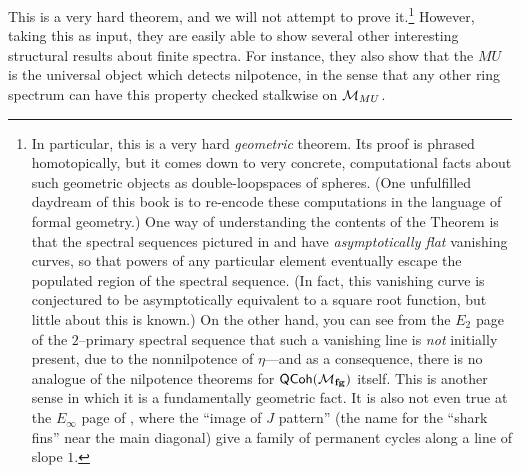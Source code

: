 \noindent This is a very hard theorem, and we will not attempt to prove it.\footnote{In particular, this is a very hard \emph{geometric} theorem.  Its proof is phrased homotopically, but it comes down to very concrete, computational facts about such geometric objects as double-loopspaces of spheres.  (One unfulfilled daydream of this book is to re-encode these computations in the language of formal geometry.)  One way of understanding the contents of the Theorem is that the spectral sequences pictured in  and  have \emph{asymptotically flat} vanishing curves, so that powers of any particular element eventually escape the populated region of the spectral sequence.  (In fact, this vanishing curve is conjectured to be asymptotically equivalent to a square root function, but little about this is known.)  On the other hand, you can see from the $E_2$ page of the $2$--primary spectral sequence that such a vanishing line is \emph{not} initially present, due to the nonnilpotence of $\eta$---and as a consequence, there is no analogue of the nilpotence theorems for $\mathsf{QCoh}(\mathcal{M}_{\mathbf{fg}})$ itself.  This is another sense in which it is a fundamentally geometric fact.  It is also not even true at the $E_\infty$ page of , where the ``image of $J$ pattern'' (the name for the ``shark fins'' near the main diagonal) give a family of permanent cycles along a line of slope $1$.}
However, taking this as input, they are easily able to show several other interesting structural results about finite spectra.  For instance, they also show that the $MU$ is the universal object which detects nilpotence, in the sense that any other ring spectrum can have this property checked stalkwise on $\mathcal{M}_{MU}$.

